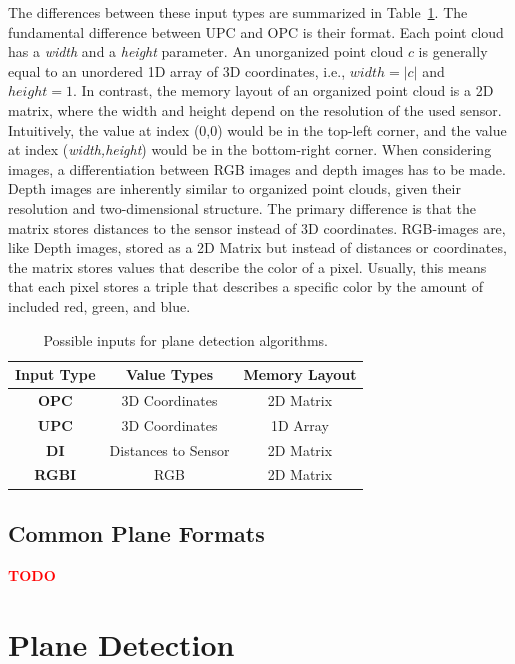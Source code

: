\documentclass[main.tex]{subfiles}
\begin{document}
The differences between these input types are summarized in Table~\ref{tab:inputs}.
The fundamental difference between UPC and OPC is their format. Each point cloud has a \textit{width} and a \textit{height} parameter.
An unorganized point cloud $c$ is generally equal to an unordered 1D array of 3D coordinates, i.e., $width = |c|$ and $height=1$.
In contrast, the memory layout of an organized point cloud is a 2D matrix, where the width and height depend on the resolution of the used sensor.
Intuitively, the value at index (0,0) would be in the top-left corner, and the value at index (\textit{width,height}) would be in the bottom-right corner.
When considering images, a differentiation between RGB images and depth images has to be made.
Depth images are inherently similar to organized point clouds, given their resolution and two-dimensional structure.
The primary difference is that the matrix stores distances to the sensor instead of 3D coordinates.
RGB-images are, like Depth images, stored as a 2D Matrix but instead of distances or coordinates, the matrix stores
values that describe the color of a pixel. Usually, this means that each pixel stores a triple that describes a specific
color by the amount of included red, green, and blue.
\begin{table}[H]
    \centering
    \begin{tabular}{c|c|c}
        \textbf{Input Type} & \textbf{Value Types} & \textbf{Memory Layout} \\ \hline
        \textbf{OPC}        & 3D Coordinates       & 2D Matrix              \\
        \textbf{UPC}        & 3D Coordinates       & 1D Array               \\
        \textbf{DI}         & Distances to Sensor  & 2D Matrix              \\
        \textbf{RGBI}       & RGB                  & 2D Matrix
    \end{tabular}
    \caption{Possible inputs for plane detection algorithms.}
    \label{tab:inputs}
\end{table}

\subsection{Common Plane Formats}

\textbf{\textcolor{red}{TODO}}

\section{Plane Detection}
\end{document}
